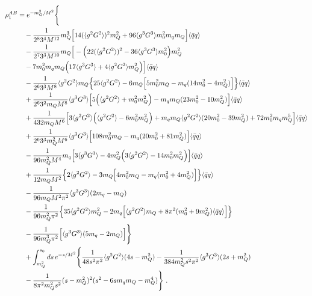 \documentclass[prd,a4paper,preprint,preprintnumbers,nofootinbib,superscriptaddress]{revtex4-2}
\def\gGthree{\langle g^3 G^3 \rangle}
\def\gGfour{(\langle g^2 G^2 \rangle)^2}
\begin{document}
\begin{equation}
\begin{aligned}
\rho_1^{AB} &= e^{-m_Q^2/M^2} \Bigg\{ \\
&\quad - \frac{1}{2^8 3^4 M^{12}} m_Q^3 \Big[
 14 \gGfour m_Q^2 + 96 \gGthree m_0^2 m_q m_Q \Big] \qq \\
&\quad - \frac{1}{2^7 3^3 M^{10}} m_Q \Big[
 - \Big( 22 \gGfour - 36 \gGthree m_0^2 \Big) m_Q^2 \\
&\quad - 7 m_0^2 m_q m_Q \Big(17 \gGthree + 4 \gGgG m_Q^2 \Big) \Big] \qq \\
&\quad - \frac{1}{2^6 3^3 M^8} \gGgG m_Q \Big\{ 25 \gGgG - 6 m_Q \Big[ 5 m_0^2 m_Q -
m_q (14 m_0^2 - 4 m_Q^2) \Big] \Big\} \qq \\
&\quad + \frac{1}{2^6 3^2 m_Q M^8} \gGthree \Big[ 5 \Big(\gGgG + m_0^2 m_Q^2 \Big) -
m_q m_Q (23 m_0^2 - 10 m_Q^2) \Big] \qq \\
&\quad + \frac{1}{432 m_Q M^6}
\Big[ 3 \gGgG \Big(\gGgG - 6 m_0^2 m_Q^2\Big) +
m_q m_Q \gGgG (20 m_0^2 - 39 m_Q^2) + 72 m_0^2 m_q m_Q^5 \Big] \qq \\
&\quad + \frac{1}{2^6 3^3 m_Q^2 M^6} \gGthree \Big[ 108 m_0^2 m_Q - m_q (20 m_0^2 + 81 m_Q^2) \Big] \qq \\
&\quad - \frac{1}{96 m_Q^2 M^4} m_q \Big[ 3 \gGthree - 
4 m_Q^2 \Big(3 \gGgG - 14 m_0^2 m_Q^2 \Big) \Big] \qq \\
&\quad + \frac{1}{12 m_Q M^2}
\Big\{ 2 \gGgG - 3 m_Q \Big[ 4 m_0^2 m_Q - m_q (m_0^2 + 4 m_Q^2) \Big] \Big\} \qq \\
&\quad - \frac{1}{96 m_Q M^2 \pi^2} \gGthree (2 m_q - m_Q) \\
&\quad - \frac{1}{96 m_Q^2 \pi^2}
\Big\{ 35 \gGgG m_Q^2 - 
2 m_q \Big[ \gGgG m_Q + 8 \pi^2 (m_0^2 + 9 m_Q^2) \qq \Big] \Big\} \\
&\quad - \frac{1}{96 m_Q^3 \pi^2} \Big[ \gGthree (5 m_q - 2 m_Q) \Big]   
\Bigg\} \\
&\quad + \int_{m_Q^2}^{s_0} ds\,
e^{-s/M^2} \Bigg\{
\frac{1}{48 s^2 \pi^2} \gGgG (4 s - m_Q^2) -
\frac{1}{384 m_Q^2 s^2 \pi^2} \gGthree (2 s + m_Q^2) \\
&\quad - \frac{1}{8 \pi^2 m_Q^2 s^2}
(s - m_Q^2)^2 (s^2 - 6 s m_q m_Q - m_Q^4)
\Bigg\}~.
\end{aligned}
\end{equation}






\end{document}
